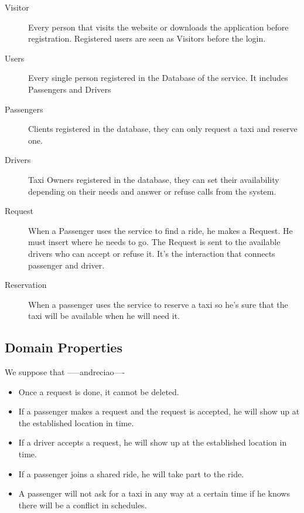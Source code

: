 \begin{description}
	\item[Visitor] Every person that visits the website or downloads the application before registration. Registered users are seen as Visitors before the login.
	\item[Users] Every single person registered in the Database of the service. It includes Passengers and Drivers
	\item[Passengers] Clients registered in the database, they can only request a taxi and reserve one.  
	\item[Drivers]	Taxi Owners registered in the database, they can set their availability depending on their needs and answer or refuse calls from the system.
	\item[Request] When a Passenger uses the service to find a ride, he makes a Request. He must insert where he needs to go. The Request is sent to the available drivers who can accept or refuse it. It's the 			interaction that connects passenger and driver. 
	\item[Reservation] When a passenger uses the service to reserve a taxi so he's sure that the taxi will be available when he will need it.
	
\end{description}

\subsection{Domain Properties}
We suppose that -----andreciao----
\begin{itemize}
	\item Once a request is done, it cannot be deleted.
	\item If a passenger makes a request and the request is accepted, he will show up at the established location in time.
	\item If a driver accepts a request, he will show up at the established location in time.
	\item If a passenger joins a shared ride, he will take part to the ride.
	\item A passenger will not ask for a taxi in any way at a certain time if he knows there will be a conflict in schedules.
\end{itemize}

